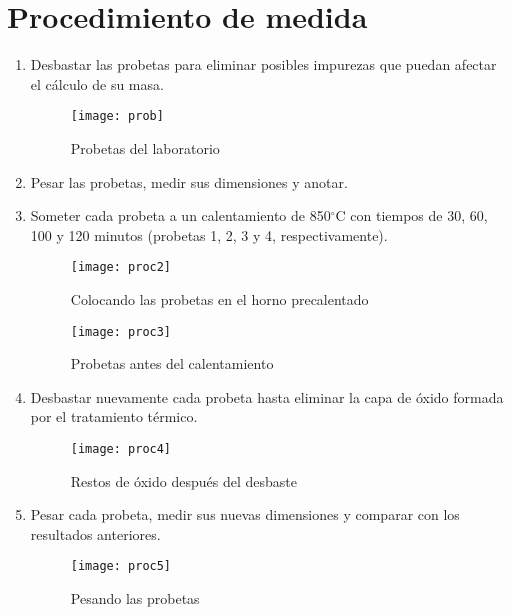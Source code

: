\documentclass[a4paper,12pt]{report}
\begin{document}
\chapter{Procedimiento de medida}
\begin{enumerate}
\item Desbastar las probetas para eliminar posibles impurezas que puedan afectar el cálculo de su masa.
\begin{figure}[H]
\begin{center}
\texttt{[image: prob]}
\caption{Probetas del laboratorio}
\end{center}
\end{figure}
\item Pesar las probetas, medir sus dimensiones y anotar.
\newpage
\item Someter cada probeta a un calentamiento de 850$^{\circ}$C con tiempos de 30, 60, 100 y 120 minutos (probetas 1, 2, 3 y 4, respectivamente). 
\begin{figure}[H]
\begin{center}
\texttt{[image: proc2]}
\caption{Colocando las probetas en el horno precalentado}
\end{center}
\end{figure}
\begin{figure}[H]
\begin{center}
\texttt{[image: proc3]}
\caption{Probetas antes del calentamiento}
\end{center}
\end{figure}
\item Desbastar nuevamente cada probeta hasta eliminar la capa de óxido formada por el tratamiento térmico.
\begin{figure}[H]
\begin{center}
\texttt{[image: proc4]}
\caption{Restos de óxido después del desbaste}
\end{center}
\end{figure}
\item Pesar cada probeta, medir sus nuevas dimensiones y comparar con los resultados anteriores.
\begin{figure}[H]
\begin{center}
\texttt{[image: proc5]}
\caption{Pesando las probetas}
\end{center}
\end{figure}
\end{enumerate}
\end{document}
